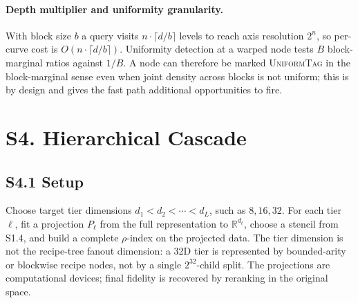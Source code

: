 \documentclass[11pt]{article}
\begin{document}
\paragraph{Depth multiplier and uniformity granularity.}
With block size $b$ a query visits $n\cdot\lceil d/b\rceil$ levels to reach axis resolution $2^n$, so per-curve cost is $O(n\cdot\lceil d/b\rceil)$. Uniformity detection at a warped node tests $B$ block-marginal ratios against $1/B$. A node can therefore be marked \textsc{UniformTag} in the block-marginal sense even when joint density across blocks is not uniform; this is by design and gives the fast path additional opportunities to fire.

\section*{S4. Hierarchical Cascade}
\label{sec:si-cascade}

\subsection*{S4.1 Setup}
Choose target tier dimensions $d_1<d_2<\cdots<d_L$, such as $8,16,32$. For each tier $\ell$, fit a projection $P_\ell$ from the full representation to $\mathbb R^{d_\ell}$, choose a stencil from S1.4, and build a complete $\rho$-index on the projected data. The tier dimension is not the recipe-tree fanout dimension: a 32D tier is represented by bounded-arity or blockwise recipe nodes, not by a single $2^{32}$-child split. The projections are computational devices; final fidelity is recovered by reranking in the original space.
\end{document}
